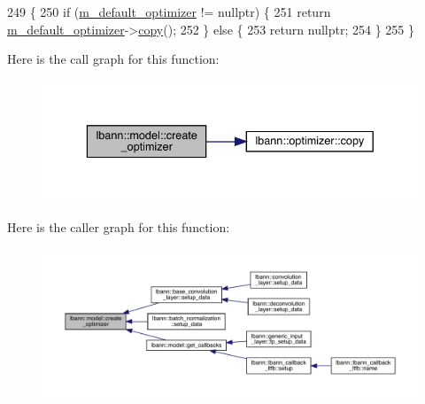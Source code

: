 \begin{DoxyCode}
249                                          \{
250   \textcolor{keywordflow}{if} (\hyperlink{classlbann_1_1model_a68df9efe547f53f7bf2a03ac64527990}{m\_default\_optimizer} != \textcolor{keyword}{nullptr}) \{
251     \textcolor{keywordflow}{return} \hyperlink{classlbann_1_1model_a68df9efe547f53f7bf2a03ac64527990}{m\_default\_optimizer}->\hyperlink{classlbann_1_1optimizer_adf19a1d19d832ebfe70072cc202cdf39}{copy}();
252   \} \textcolor{keywordflow}{else} \{
253     \textcolor{keywordflow}{return} \textcolor{keyword}{nullptr};
254   \}
255 \}
\end{DoxyCode}
Here is the call graph for this function\+:\nopagebreak
\begin{figure}[H]
\begin{center}
\leavevmode
\includegraphics[width=336pt]{classlbann_1_1model_a0d2d5a1eac592e5721a81a9b9ea4b7f2_cgraph}
\end{center}
\end{figure}
Here is the caller graph for this function\+:\nopagebreak
\begin{figure}[H]
\begin{center}
\leavevmode
\includegraphics[width=350pt]{classlbann_1_1model_a0d2d5a1eac592e5721a81a9b9ea4b7f2_icgraph}
\end{center}
\end{figure}
\mbox{\label{classlbann_1_1model_a156acfa740b92322d44b6c477636eb26}} 
